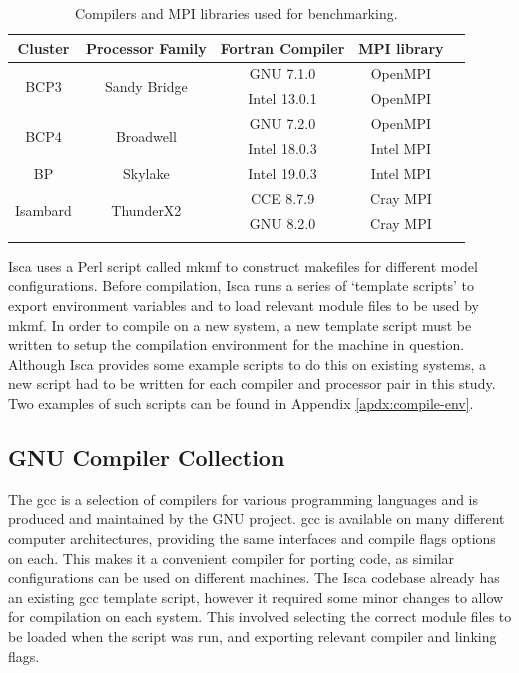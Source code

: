 \documentclass[a4paper,11pt]{report}
\begin{document}
\begin{table}[htp]
\caption{Compilers and MPI libraries used for benchmarking.}
\begin{center}
\begin{tabular}{c c c c c}
 \toprule

\textbf{Cluster} 			&	\textbf{Processor Family}		&	\textbf{Fortran Compiler}		&	\textbf{MPI library}	 \\
\midrule
\multirow{2}{*}{BCP3} 	&	\multirow{2}{*}{Sandy Bridge}	&	GNU 7.1.0 			&	OpenMPI	 \\
					& 							& 	Intel 13.0.1			&	OpenMPI			\\
\midrule	
\multirow{2}{*}{BCP4}	&	\multirow{2}{*}{Broadwell}		&	GNU 7.2.0			&	OpenMPI			\\
	&											&	Intel 18.0.3			&	Intel MPI			\\
\midrule	
BP					&	Skylake					&	Intel 19.0.3 			&	Intel MPI			\\
\midrule			
\multirow{2}{*}{Isambard}	&	\multirow{2}{*}{ThunderX2}	&	CCE 8.7.9				&	Cray MPI			\\
					&							&	GNU 8.2.0			&	Cray MPI			\\
\bottomrule \\
\end{tabular}	
\end{center}
\label{tbl:compilers}
\end{table}%
\par
Isca uses a Perl script called \gls{mkmf} to construct makefiles for different model configurations. Before compilation, Isca runs a series of `template scripts' to export environment variables and to load relevant module files to be used by \gls{mkmf}. In order to compile on a new system, a new template script must be written to setup the compilation environment for the machine in question. Although Isca provides some example scripts to do this on existing systems, a new script had to be written for each compiler and processor pair in this study. Two examples of such scripts can be found in Appendix \ref{apdx:compile-env}.  

\subsection{GNU Compiler Collection}
The \gls{gcc} is a selection of compilers for various programming languages and is produced and maintained by the GNU project. \gls{gcc} is available on many different computer architectures, providing the same interfaces and compile flags options on each. This makes it a convenient compiler for porting code, as similar configurations can be used on different machines. The Isca codebase already has an existing \gls{gcc} template script, however it required some minor changes to allow for compilation on each system. This involved selecting the correct module files to be loaded when the script was run, and exporting relevant compiler and linking flags.
\end{document}
